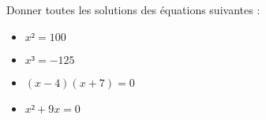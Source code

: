 \documentclass[
	classe=$1^{ere}STI2D$,
	headerTitle=Interrogation
]{évaluation}
\begin{document}
\begin{exercice}
	Donner toutes les solutions des équations suivantes :
	\begin{multicols}{2}
		\begin{itemize}
			\item $x² = 100$\vspace{\spacing}

			\item $x³ = -125$\vspace{\spacing}

			\item $(x - 4)(x + 7) = 0$\vspace{\spacing}

			\item $x² + 9x = 0$\vspace{\spacing}

		\end{itemize}
	\end{multicols}
\end{exercice}
\end{document}
